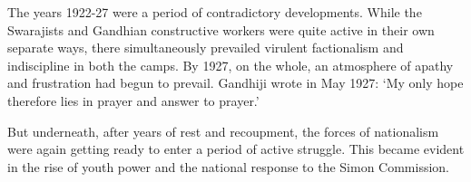 The years 1922-27 were a period of contradictory developments. While the Swarajists and Gandhian constructive workers were quite active in their own separate ways, there simultaneously prevailed virulent factionalism and indiscipline in both the camps. By 1927, on the whole, an atmosphere of apathy and frustration had begun to prevail. Gandhiji wrote in May 1927: `My only hope therefore lies in prayer and answer to prayer.'

But underneath, after years of rest and recoupment, the forces of nationalism were again getting ready to enter a period of active struggle. This became evident in the rise of youth power and the national response to the Simon Commission.
